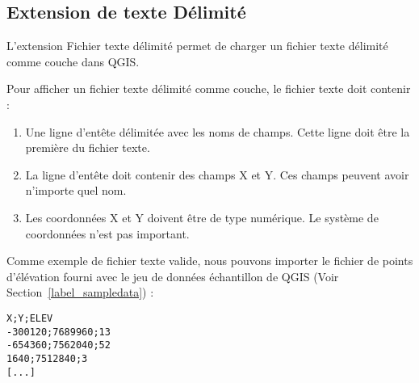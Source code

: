 
\subsection{Extension de texte Délimité}\label{label_dltext}    


L'extension Fichier texte délimité permet de charger un fichier texte délimité comme couche dans QGIS.


Pour afficher un fichier texte délimité comme couche, le fichier texte doit contenir :

\begin{enumerate}      
\item Une ligne d'entête délimitée avec les noms de champs. Cette ligne doit être la première du fichier texte.
\item La ligne d'entête doit contenir des champs X et Y. Ces champs peuvent avoir n'importe quel nom.
\item Les coordonnées X et Y doivent être de type numérique. Le système de coordonnées n'est pas important.
\end{enumerate}

Comme exemple de fichier texte valide, nous pouvons importer le fichier de points d'élévation
 fourni avec le jeu de données échantillon de QGIS (Voir Section~\ref{label_sampledata}) :

\begin{verbatim} 
X;Y;ELEV
-300120;7689960;13
-654360;7562040;52
1640;7512840;3
[...]
\end{verbatim}

